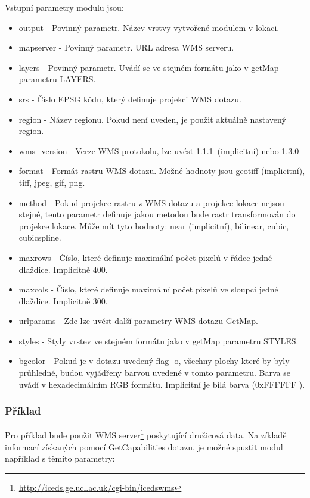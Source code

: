 \documentclass[a4paper,12pt]{article}
\begin{document}
Vstupní parametry modulu jsou:
\begin{itemize}
  \item   output -  Povinný parametr. Název vrstvy vytvořené modulem v lokaci.
  \item   mapserver -  Povinný parametr. URL adresa WMS serveru.
 \item     layers - Povinný parametr. Uvádí se ve stejném formátu jako v getMap parametru LAYERS.
 \item     srs - Číslo EPSG kódu, který definuje projekci WMS dotazu. 
 \item     region - Název regionu. Pokud není uveden, je použit aktuálně nastavený region. 
 \item     wms\_version - Verze WMS protokolu, lze uvést 1.1.1\ (implicitní) nebo 1.3.0 
 \item     format - Formát rastru WMS dotazu. Možné hodnoty jsou  geotiff (implicitní), tiff, jpeg, gif, png. 
 \item     method - Pokud projekce rastru z WMS dotazu a projekce lokace nejsou stejné, tento parametr definuje jakou metodou bude rastr transformován do projekce lokace. Může mít tyto hodnoty: near (implicitní), bilinear, cubic, cubicspline.

 \item    maxrows - Číslo, které definuje maximální počet pixelů v řádce jedné dlaždice. Implicitně 400.
 \item    maxcols - Číslo, které definuje maximální počet pixelů ve sloupci jedné dlaždice. Implicitně 300.
 \item    urlparams - Zde lze uvést další parametry WMS dotazu GetMap.
 \item    styles - Styly vrstev ve stejném formátu jako v getMap parametru STYLES.
 \item    bgcolor - Pokud je v dotazu uvedený flag -o, všechny plochy které by byly průhledné, budou vyjádřeny barvou uvedené v tomto parametru. Barva se uvádí v hexadecimálním RGB formátu. Implicitní je bílá barva (0xFFFFFF
).
\end{itemize}

\subsubsection{Příklad}

Pro příklad bude použit WMS server\footnote{\url{http://iceds.ge.ucl.ac.uk/cgi-bin/icedswms}} poskytující družicová data. Na zíkladě informací získaných pomocí GetCapabilities dotazu, je možné spustit modul například s těmito parametry:
\end{document}
